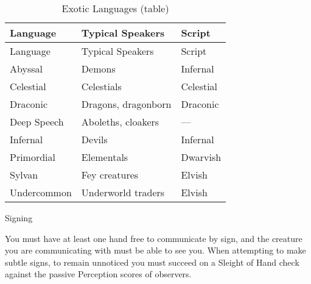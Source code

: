 \begin{longtable}[]{@{}
  >{\raggedright\arraybackslash}p{}
  >{\raggedright\arraybackslash}p{}
  >{\raggedright\arraybackslash}p{}@{}}
\caption{Exotic Languages
(table)}\label{languages-exotic-table}\tabularnewline
\toprule\noalign{}
\begin{minipage}[b]{\linewidth}\raggedright
Language
\end{minipage} & \begin{minipage}[b]{\linewidth}\raggedright
Typical Speakers
\end{minipage} & \begin{minipage}[b]{\linewidth}\raggedright
Script
\end{minipage} \\
\midrule\noalign{}
\endfirsthead
\toprule\noalign{}
\begin{minipage}[b]{\linewidth}\raggedright
Language
\end{minipage} & \begin{minipage}[b]{\linewidth}\raggedright
Typical Speakers
\end{minipage} & \begin{minipage}[b]{\linewidth}\raggedright
Script
\end{minipage} \\
\midrule\noalign{}
\endhead
\bottomrule\noalign{}
\endlastfoot
Abyssal & Demons & Infernal \\
Celestial & Celestials & Celestial \\
Draconic & Dragons, dragonborn & Draconic \\
Deep Speech & Aboleths, cloakers & --- \\
Infernal & Devils & Infernal \\
Primordial & Elementals & Dwarvish \\
Sylvan & Fey creatures & Elvish \\
Undercommon & Underworld traders & Elvish \\
\end{longtable}

Signing

You must have at least one hand free to communicate by sign, and the
creature you are communicating with must be able to see you. When
attempting to make subtle signs, to remain unnoticed you must succeed on
a Sleight of Hand check against the passive Perception scores of
observers.

